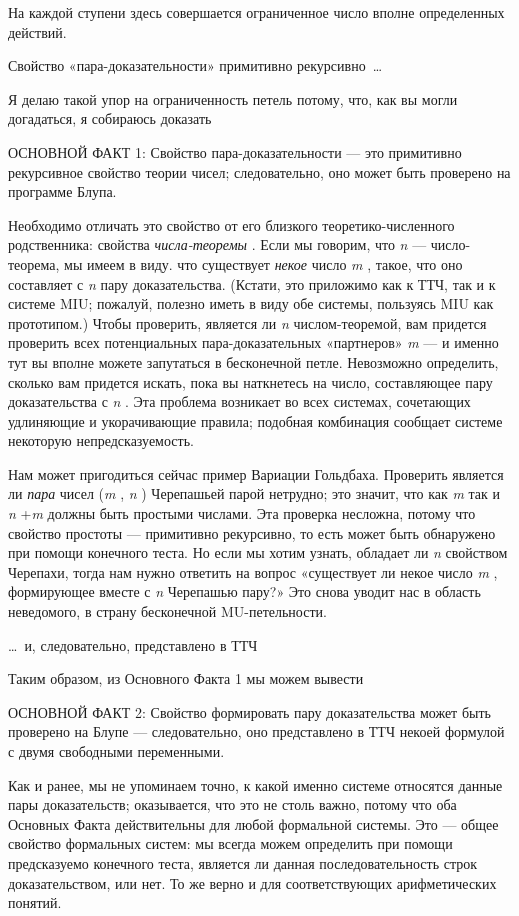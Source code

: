 \documentclass[../main.tex]{subfiles}
\begin{document}
На каждой ступени здесь совершается ограниченное число вполне определенных действий.

Свойство «пара-доказательности» примитивно рекурсивно~\ldots{}

Я делаю такой упор на ограниченность петель потому, что, как вы могли догадаться, я собираюсь доказать

ОСНОВНОЙ ФАКТ 1: Свойство пара-доказательности --- это примитивно рекурсивное свойство теории чисел; следовательно, оно может быть проверено на программе Блупа.

Необходимо отличать это свойство от его близкого теоретико-численного родственника: свойства \emph{числа-теоремы} . Если мы говорим, что \emph{n} --- число-теорема, мы имеем в виду. что существует \emph{некое} число \emph{m} , такое, что оно составляет с \emph{n} пару доказательства. (Кстати, это приложимо как к ТТЧ, так и к системе MIU; пожалуй, полезно иметь в виду обе системы, пользуясь MIU как прототипом.) Чтобы проверить, является ли \emph{n} числом-теоремой, вам придется проверить всех потенциальных пара-доказательных «партнеров» \emph{m} --- и именно тут вы вполне можете запутаться в бесконечной петле. Невозможно определить, сколько вам придется искать, пока вы наткнетесь на число, составляющее пару доказательства с \emph{n} . Эта проблема возникает во всех системах, сочетающих удлиняющие и укорачивающие правила; подобная комбинация сообщает системе некоторую непредсказуемость.

Нам может пригодиться сейчас пример Вариации Гольдбаха. Проверить является ли \emph{пара} чисел (\emph{m} , \emph{n} ) Черепашьей парой нетрудно; это значит, что как \emph{m} так и \emph{n} +\emph{m} должны быть простыми числами. Эта проверка несложна, потому что свойство простоты --- примитивно рекурсивно, то есть может быть обнаружено при помощи конечного теста. Но если мы хотим узнать, обладает ли \emph{n} свойством Черепахи, тогда нам нужно ответить на вопрос «существует ли некое число \emph{m} , формирующее вместе с \emph{n} Черепашью пару?» Это снова уводит нас в область неведомого, в страну бесконечной MU-петельности.

\ldots~и, следовательно, представлено в ТТЧ

Таким образом, из Основного Факта 1 мы можем вывести

ОСНОВНОЙ ФАКТ 2: Свойство формировать пару доказательства может быть проверено на Блупе --- следовательно, оно представлено в ТТЧ некоей формулой с двумя свободными переменными.

Как и ранее, мы не упоминаем точно, к какой именно системе относятся данные пары доказательств; оказывается, что это не столь важно, потому что оба Основных Факта действительны для любой формальной системы. Это --- общее свойство формальных систем: мы всегда можем определить при помощи предсказуемо конечного теста, является ли данная последовательность строк доказательством, или нет. То же верно и для соответствующих арифметических понятий.
\end{document}
